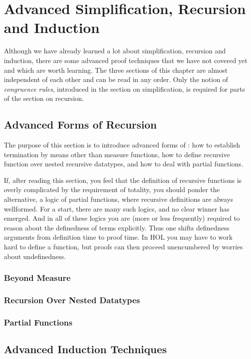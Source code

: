 \chapter{Advanced Simplification, Recursion and Induction}

Although we have already learned a lot about simplification, recursion and
induction, there are some advanced proof techniques that we have not covered
yet and which are worth learning. The three sections of this chapter are almost
independent of each other and can be read in any order. Only the notion of
\emph{congruence rules}, introduced in the section on simplification, is
required for parts of the section on recursion.



\section{Advanced Forms of Recursion}

The purpose of this section is to introduce advanced forms of
: how to establish termination by means other than measure
functions, how to define recursive function over nested recursive datatypes,
and how to deal with partial functions.

If, after reading this section, you feel that the definition of recursive
functions is overly complicated by the requirement of
totality, you should ponder the alternative, a logic of partial functions,
where recursive definitions are always wellformed. For a start, there are many
such logics, and no clear winner has emerged. And in all of these logics you
are (more or less frequently) required to reason about the definedness of
terms explicitly. Thus one shifts definedness arguments from definition time to
proof time. In HOL you may have to work hard to define a function, but proofs
can then proceed unencumbered by worries about undefinedness.

\subsection{Beyond Measure}
\label{sec:beyond-measure}


\subsection{Recursion Over Nested Datatypes}
\label{sec:nested-recdef}




\subsection{Partial Functions}



\section{Advanced Induction Techniques}
\label{sec:advanced-ind}


